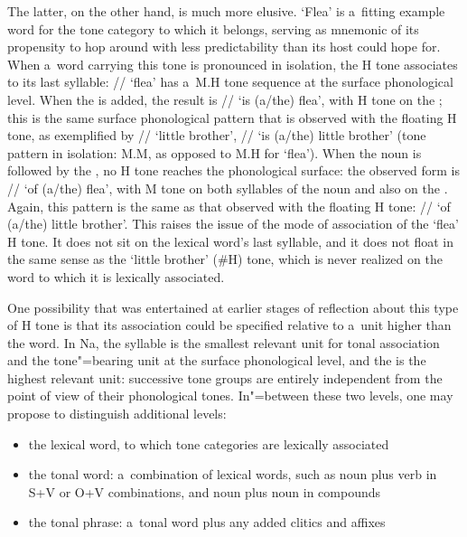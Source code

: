 The latter, on the other hand, is much more elusive. ‘Flea’ is a~fitting example word for the tone category to which it belongs, serving as mnemonic of its propensity to hop around with less predictability than its host could hope for. When a~word carrying this tone is pronounced in isolation, the H tone associates to its last syllable: // ‘flea’ has a~M.H tone sequence at the surface phonological level. When the  is added, the result is // ‘is \mbox{(a/the)} flea’, with H tone on the ; this is the same surface phonological pattern that is observed with the floating H tone, as exemplified by // ‘little
brother’, // ‘is \mbox{(a/the)} little
brother’ (tone pattern in isolation: M.M, as opposed to M.H for ‘flea’). When the noun is followed by the , no H tone reaches the phonological surface: the observed form is // ‘of \mbox{(a/the)} flea’, with M tone on both syllables of the
noun and also on the . Again, this pattern is the same as that observed with the floating H tone: // ‘of \mbox{(a/the)} little brother’. This raises the issue of the mode of association of the ‘flea’ H tone. It does not sit on the lexical word's last syllable, and it does not float in the same sense as the ‘little brother’ (\#H) tone, which is never realized on the word to which it is lexically associated. 

One possibility that was entertained at earlier stages of reflection about this type of H tone is that its association could be specified relative to a~unit higher than the word. In Na, the syllable is the smallest relevant unit for tonal association and the tone"=bearing unit at the surface phonological level, and the  is the highest relevant unit: successive tone groups are
entirely independent from the point of view of their phonological tones. In"=between these two levels, one may propose to distinguish additional levels:

\begin{itemize}
	\item{the lexical word, to which tone categories are lexically associated}
	\item{the tonal word: a~combination of lexical words, such as noun plus verb in S+V or O+V
		combinations, and noun plus noun in compounds}
	\item{the tonal phrase: a~tonal word plus any added clitics and affixes}
\end{itemize}

